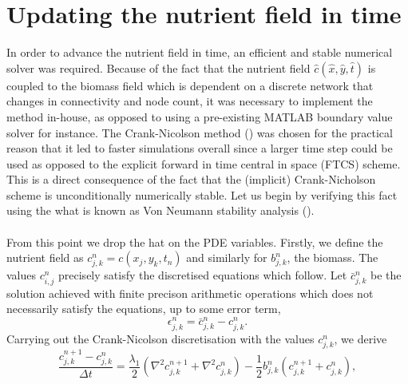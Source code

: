 \section{Updating the nutrient field in time}
In order to advance the nutrient field in time, an efficient and stable numerical solver
was required. Because of the fact that the nutrient field $\hat{c}(\hat{x},\hat{y},\hat{t})$ is coupled 
to the biomass field which is dependent on a discrete network that changes in connectivity and 
node count, it was necessary to implement the method in-house, as opposed to 
using a pre-existing MATLAB boundary value solver for instance. The Crank-Nicolson method (\cite{crank1947practical}) was 
chosen for the practical reason that it led to faster simulations overall since a larger
time step could be used as opposed to the explicit forward in time central in space (FTCS) scheme. This 
is a direct consequence of the fact that the (implicit) Crank-Nicholson scheme is unconditionally numerically 
stable. Let us begin by verifying this fact using the what is
known as Von Neumann stability analysis (\cite{charney1950numerical}).
\\
\\

From this point we drop the hat on the PDE variables. Firstly, we 
define the nutrient field as $c_{j,k}^{n} = c(x_j, y_k, t_n)$ and similarly for $b_{j,k}^{n}$,
the biomass. The values  $c_{i,j}^{n}$ precisely satisfy the discretised equations which follow.
Let  $\bar{c}_{j,k}^{n}$ be the solution achieved with finite precison arithmetic 
operations which does not necessarily satisfy the equations, up to some error term,
\begin{equation*}
    \epsilon_{j,k}^n = \bar{c}_{j,k}^{n} - c_{j,k}^{n}.
\end{equation*}
Carrying out the Crank-Nicolson discretisation with the values $c_{j,k}^{n}$, we derive
\begin{equation*}
    \frac{c_{j,k}^{n+1} - c_{j,k}^{n}}{\Delta t} =
    \frac{\lambda_1}{2} \left( \nabla^2 c_{j,k}^{n+1} + \nabla^2 c_{j,k}^{n} \right) -
     \frac{1}{2} b_{j,k}^{n} (c_{j,k}^{n+1} + c_{j,k}^{n}),
\end{equation*}


